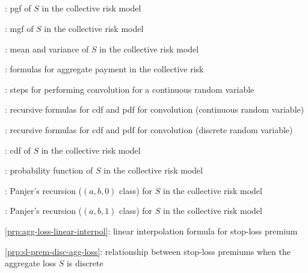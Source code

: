 \subsection*{}
\item {}: pgf of \(S\) in the collective risk model
\item {}: mgf of \(S\) in the collective risk model
\item {}: mean and variance of \(S\) in the collective risk model
\item {}: formulas for aggregate payment in the collective risk
\item {}: steps for performing convolution for a continuous random variable
\item {}: recursive formulas for cdf and pdf for convolution (continuous random variable)
\item {}: recursive formulas for cdf and pdf for convolution (discrete random variable)
\item {}: cdf of \(S\) in the collective risk model
\item {}: probability function of \(S\) in the collective risk model
\item {}: Panjer's recursion (\((a,b,0)\) class) for \(S\) in the collective risk model
\item {}: Panjer's recursion (\((a,b,1)\) class) for \(S\) in the collective risk model
\item \cref{prp:agg-loss-linear-interpol}: linear interpolation formula for stop-loss premium
\item \cref{prp:sl-prem-disc-agg-loss}: relationship between stop-loss premiums when the aggregate loss \(S\) is discrete
